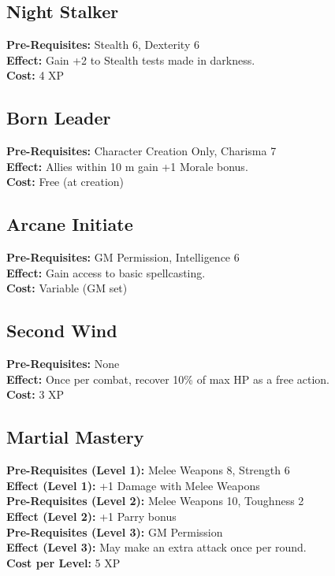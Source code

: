 \documentclass[12pt]{article}
\begin{document}
\begin{multicols}{2}
\medskip

\subsection*{Night Stalker}
\textbf{Pre-Requisites:} Stealth 6, Dexterity 6\\
\textbf{Effect:} Gain +2 to Stealth tests made in darkness.\\
\textbf{Cost:} 4 XP

\medskip

\subsection*{Born Leader}
\textbf{Pre-Requisites:} Character Creation Only, Charisma 7\\
\textbf{Effect:} Allies within 10 m gain +1 Morale bonus.\\
\textbf{Cost:} Free (at creation)

\medskip

\subsection*{Arcane Initiate}
\textbf{Pre-Requisites:} GM Permission, Intelligence 6\\
\textbf{Effect:} Gain access to basic spellcasting.\\
\textbf{Cost:} Variable (GM set)

\medskip

\subsection*{Second Wind}
\textbf{Pre-Requisites:} None\\
\textbf{Effect:} Once per combat, recover 10\% of max HP as a free action.\\
\textbf{Cost:} 3 XP

\medskip

\subsection*{Martial Mastery}
\textbf{Pre-Requisites (Level 1):} Melee Weapons 8, Strength 6\\
\textbf{Effect (Level 1):} +1 Damage with Melee Weapons\\[0.25em]
\textbf{Pre-Requisites (Level 2):} Melee Weapons 10, Toughness 2\\
\textbf{Effect (Level 2):} +1 Parry bonus\\[0.25em]
\textbf{Pre-Requisites (Level 3):} GM Permission\\
\textbf{Effect (Level 3):} May make an extra attack once per round.\\
\textbf{Cost per Level:} 5 XP

\end{multicols}
\newpage
\end{document}
